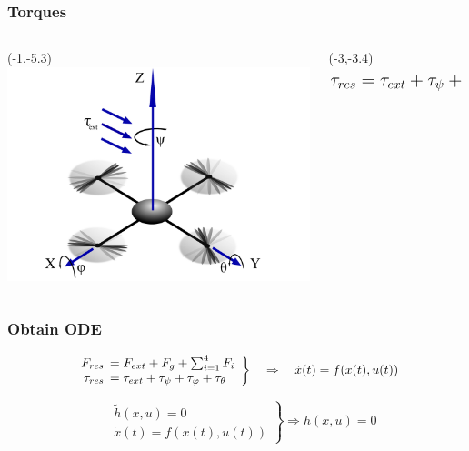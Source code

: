 \begin{frame}
		\frametitle{Torques}
			\begin{columns}[T] %
			\begin{column}{.7\textwidth}
				\begin{textblock}{0}(-1,-5.3)
					\includegraphics[width=11cm]{images/Copter_Text.pdf}
				\end{textblock}
			\end{column}
			\begin{column}{0.35\textwidth}
				\begin{textblock}{0}(-3,-3.4)
					\[ \mathlarger{\mathlarger{\tau_{res} = \tau_{ext}+\tau_{\psi}+\tau_{\varphi}+\tau_{\theta}}} \]
				\end{textblock}
				\end{column}
		\end{columns}
\end{frame}

\begin{frame}
	\frametitle{Obtain ODE}
	\begin{block}{}
		\centering
		\[\left. \begin{array}{rl} F_{res} \hspace{-1.25ex} &= F_{ext} + F_{g} + \sum_{i=1}^{4}{F_{i}} \\ \tau_{res} \hspace{-1.25ex} &= \tau_{ext} + \tau_{\psi} + \tau_{\varphi} + \tau_{\theta}  \end{array} \right\} \quad \Rightarrow \quad \dot{x}(t)=f(x(t),u(t)) \]
		\vspace{1ex}
	\end{block}
	
	\vspace{2em}
	
	\begin{block}{}
		\begin{center}
		 	\[ \quad \left. \begin{array}{c} \tilde{h}(x,u)=0 \\  \dot{x}(t) = f(x(t),u(t)) \end{array} \right\} \Rightarrow h(x,u) = 0	\]
		\end{center}
		\vspace{1ex}
	\end{block}
	
\end{frame}
